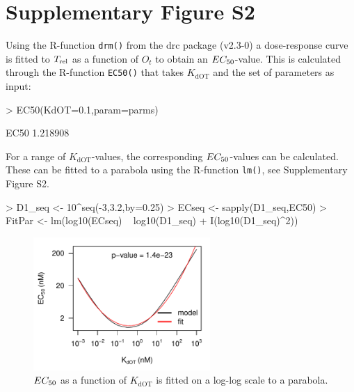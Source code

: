 \documentclass[a4paper,11pt]{article}
\newenvironment{Ncenter}{%
  \setlength\topsep{-10pt}
  \setlength\parskip{-10pt}
  \begin{center}
}{%
  \end{center}
}
\newcommand{\Trel}{T_{\rm{rel}}}
\newcommand{\EC}{EC_{\rm{50}}}
\newcommand{\KdOT}{K_{\mathrm{dOT}}}
\begin{document}
\section{Supplementary Figure S2}
Using the R-function \texttt{drm()} from the drc package (v2.3-0) a dose-response curve is fitted to $\Trel$ as a function of $O_t$ to obtain an $\EC$-value. This is calculated through the R-function \texttt{EC50()} that takes $\KdOT$ and the set of parameters as input:
\begin{Schunk}
\begin{Sinput}
> EC50(KdOT=0.1,param=parms)
\end{Sinput}
\begin{Soutput}
    EC50 
1.218908 
\end{Soutput}
\end{Schunk}
For a range of $\KdOT$-values, the corresponding $\EC$-values can be calculated. These can be fitted to a parabola using the R-function \texttt{lm()}, see Supplementary Figure S2. 
\begin{Schunk}
\begin{Sinput}
> D1_seq <- 10^seq(-3,3.2,by=0.25)
> ECseq <- sapply(D1_seq,EC50)
> FitPar <- lm(log10(ECseq) ~ log10(D1_seq) + I(log10(D1_seq)^2))
\end{Sinput}
\end{Schunk}
\begin{figure}[!h]
\begin{Ncenter}
\includegraphics[width=0.6\textwidth]{SuppFile1-S31.pdf}
\end{Ncenter}
\caption{$\EC$ as a function of $\KdOT$ is fitted on a log-log scale to a parabola.}\label{fig::Optfit}
\end{figure}


\end{document}
